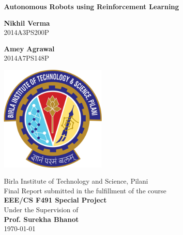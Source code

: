 \documentclass[12pt]{extreport}
\begin{document}
\begin{titlepage}
	\begin{center}

		\vspace*{1cm}

		\begin{huge}
			\textbf{Autonomous Robots using Reinforcement Learning}
		\end{huge}

            \vspace{0.5cm}

            \begin{multicols}{2}
                \textbf{Nikhil Verma}\\
                2014A3PS200P

                \textbf{Amey Agrawal}\\
                2014A7PS148P
            \end{multicols}

            \vspace{1cm}

            \includegraphics[width=0.4\textwidth]{logo}
            \vspace{1cm}

            Birla Institute of Technology and Science, Pilani\\
			\vspace{0.5cm}
            Final Report submitted in the fulfillment of the course\\
			\textbf{EEE/CS F491 Special Project}\\
            Under the Supervision of\\
            \textbf{Prof. Surekha Bhanot}\\
            \vspace{0.5cm}
            \today


	\end{center}
\end{titlepage}
\end{document}
